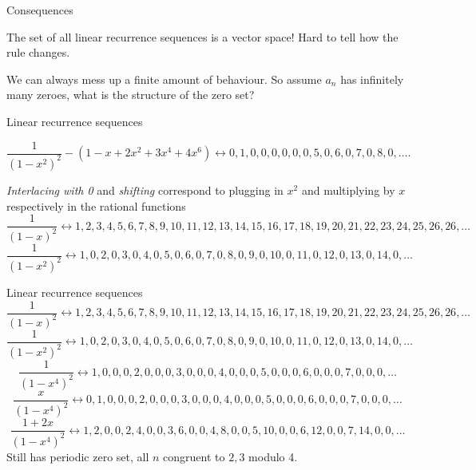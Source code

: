 \documentclass[notheorems]{beamer}
\theoremstyle{plain}
\begin{document}
\begin{frame}{Consequences}
    \begin{observation}{}{}
        The set of all linear recurrence sequences is a vector space! Hard to tell how the rule changes.
    \end{observation}
    \pause
    We can always mess up a finite amount of behaviour. So assume \(a_n\) has infinitely many zeroes, what is the structure of the zero set?%
\end{frame}

\begin{frame}{Linear recurrence sequences}
    \begin{example}{}{}
        \begin{equation*}
            \frac{1}{(1-x^2)^2} - (1 - x + 2x^2 + 3x^4 + 4x^6)
            \leftrightarrow 0,1,0,0,0,0,0,0,5,0,6,0,7,0,8,0,\ldots\text{.}
        \end{equation*}
        \pause
    \end{example}
    \emph{Interlacing with 0} and \emph{shifting} correspond to plugging in \(x^2\) and multiplying by \(x\) respectively in the rational functions
    \pause
    \begin{equation*}
        \frac{1}{(1-x)^2} \leftrightarrow 1,2,3,4,5,6,7,8,9,10,11,12,13,14,15,16,17,18,19,20,21,22,23,24,25,26,26,\ldots
    \end{equation*}
    \pause
    \begin{equation*}
        \frac{1}{(1-x^2)^2} \leftrightarrow 1,0,2,0,3,0,4,0,5,0,6,0,7,0,8,0,9,0,10,0,11,0,12,0,13,0,14,0,\ldots
    \end{equation*}
\end{frame}

\begin{frame}{Linear recurrence sequences}
    \begin{equation*}
        \frac{1}{(1-x)^2} \leftrightarrow 1,2,3,4,5,6,7,8,9,10,11,12,13,14,15,16,17,18,19,20,21,22,23,24,25,26,26,\ldots
    \end{equation*}
    \begin{equation*}
        \frac{1}{(1-x^2)^2} \leftrightarrow 1,0,2,0,3,0,4,0,5,0,6,0,7,0,8,0,9,0,10,0,11,0,12,0,13,0,14,0,\ldots
    \end{equation*}
    \begin{equation*}
        \frac{1}{(1-x^4)^2} \leftrightarrow 1,0,0,0,2,0,0,0,3,0,0,0,4,0,0,0,5,0,0,0,6,0,0,0,7,0,0,0,\ldots
    \end{equation*}
    \pause
    \begin{equation*}
        \frac{x}{(1-x^4)^2} \leftrightarrow 0,1,0,0,0,2,0,0,0,3,0,0,0,4,0,0,0,5,0,0,0,6,0,0,0,7,0,0,0,\ldots
    \end{equation*}
    \pause
    \begin{equation*}
        \frac{1+2x}{(1-x^4)^2} \leftrightarrow 1,2,0,0,2,4,0,0,3,6,0,0,4,8,0,0,5,10,0,0,6,12,0,0,7,14,0,0,\ldots
    \end{equation*}
    \pause
    Still has periodic zero set, all \(n\) congruent to \(2,3\) modulo 4.%
    \par
\end{frame}
\end{document}
